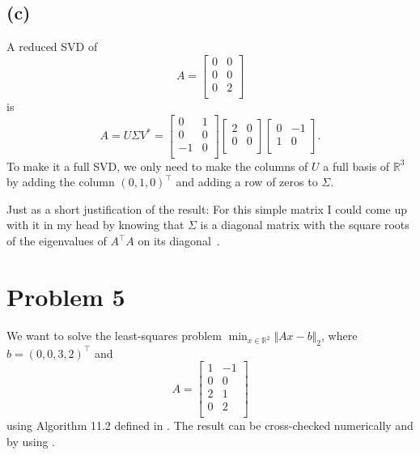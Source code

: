 \documentclass[a4paper, 11pt]{article}
\begin{document}
\subsection*{(c)}
A reduced SVD of
\begin{equation*}
 A =
  \begin{bmatrix}
  0 & 0 \\
  0 & 0 \\
  0 & 2 \\
  \end{bmatrix}
\end{equation*}
is
\begin{equation*}
 A = U\Sigma V^* =
  \begin{bmatrix}
  0 & 1 \\
  0 & 0 \\
  -1 & 0 \\
  \end{bmatrix}
  \begin{bmatrix}
  2 & 0 \\
  0 & 0 \\
  \end{bmatrix}
  \begin{bmatrix}
  0 & -1 \\
  1 & 0 \\
  \end{bmatrix}.
\end{equation*}
To make it a full SVD, we only need to make the columns of $U$ a full basis of
$\mathbb{R}^{3}$ by adding the column $(0, 1, 0)^{\top}$ and adding a row of zeros
to $\Sigma$.

Just as a short justification of the result: For this simple
matrix I could come up with it in my head by knowing that $\Sigma$ is a
diagonal matrix with the square roots of the eigenvalues of $A^\top A$
on its diagonal~\cite[Theorem 5.4]{tb}.

\section*{Problem 5}
We want to solve the least-squares problem $\min_{x \in \mathbb{R}^2} \Vert Ax
- b\Vert_2$, where $b
= (0, 0, 3, 2)^\top$ and
\begin{equation*}
  A =
  \begin{bmatrix}
  1 & -1 \\
  0 & 0 \\
  2 & 1 \\
  0 & 2 \\
  \end{bmatrix}
\end{equation*}
using Algorithm 11.2 defined in \cite{tb}. The result can be cross-checked
numerically and by using \cite[(11.12)]{tb}.
\end{document}
